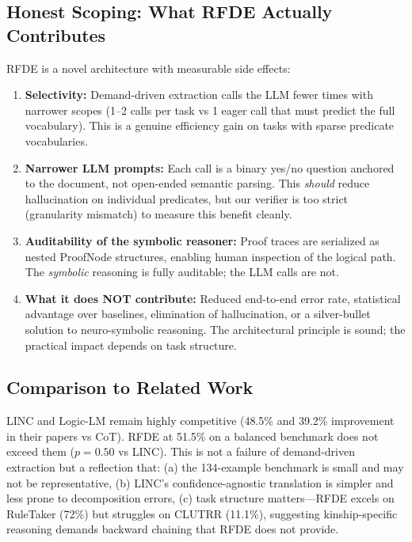 \documentclass[11pt,letterpaper]{article}
\begin{document}
\subsection{Honest Scoping: What RFDE Actually Contributes}

RFDE is a novel architecture with measurable side effects:

\begin{enumerate}
  \item \textbf{Selectivity:} Demand-driven extraction calls the LLM fewer times with narrower scopes (1--2 calls per task vs 1 eager call that must predict the full vocabulary). This is a genuine efficiency gain on tasks with sparse predicate vocabularies.

  \item \textbf{Narrower LLM prompts:} Each call is a binary yes/no question anchored to the document, not open-ended semantic parsing. This \emph{should} reduce hallucination on individual predicates, but our verifier is too strict (granularity mismatch) to measure this benefit cleanly.

  \item \textbf{Auditability of the symbolic reasoner:} Proof traces are serialized as nested ProofNode structures, enabling human inspection of the logical path. The \emph{symbolic} reasoning is fully auditable; the LLM calls are not.

  \item \textbf{What it does NOT contribute:} Reduced end-to-end error rate, statistical advantage over baselines, elimination of hallucination, or a silver-bullet solution to neuro-symbolic reasoning. The architectural principle is sound; the practical impact depends on task structure.
\end{enumerate}

\subsection{Comparison to Related Work}

LINC and Logic-LM remain highly competitive (48.5\% and 39.2\% improvement in their papers vs CoT). RFDE at 51.5\% on a balanced benchmark does not exceed them ($p=0.50$ vs LINC). This is not a failure of demand-driven extraction but a reflection that: (a) the 134-example benchmark is small and may not be representative, (b) LINC's confidence-agnostic translation is simpler and less prone to decomposition errors, (c) task structure matters---RFDE excels on RuleTaker (72\%) but struggles on CLUTRR (11.1\%), suggesting kinship-specific reasoning demands backward chaining that RFDE does not provide.
\end{document}

